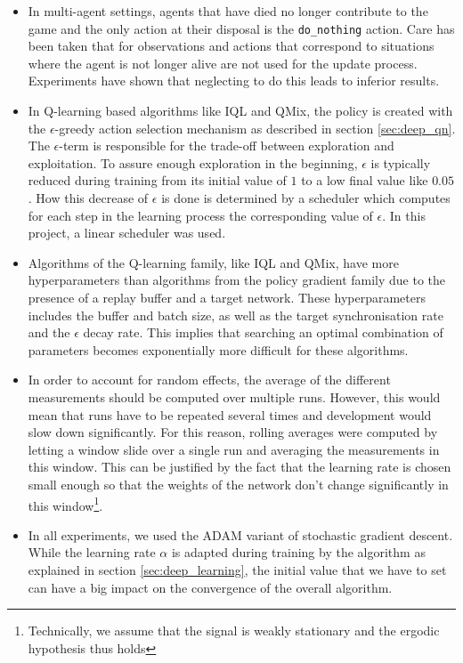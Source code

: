 \begin{itemize}
\begin{equation}
        \end{equation}
    \item In multi-agent settings, agents that have died no longer contribute to the game and the only action at their disposal is the {\tt do\_nothing} action. Care has been taken that for observations and actions that correspond to situations where the agent is not longer alive are not used for the update process. Experiments have shown that neglecting to do this leads to inferior results.
    \item In Q-learning based algorithms like IQL and QMix, the policy is created with the $\epsilon$-greedy action selection mechanism as described in section \ref{sec:deep_qn}. The $\epsilon$-term is responsible for the trade-off between exploration and exploitation. To assure enough exploration in the beginning, $\epsilon$ is typically reduced during training from its initial value of $1$ to a low final value like $0.05$. How this decrease of $\epsilon$ is done is determined by a scheduler which computes for each step in the learning process the corresponding value of $\epsilon$. In this project, a linear scheduler was used.
    \item Algorithms of the Q-learning family, like IQL and QMix, have more hyperparameters than algorithms from the policy gradient family due to the presence of a replay buffer and a target network. These hyperparameters includes the buffer and batch size, as well as the target synchronisation rate and the $\epsilon$ decay rate. This implies that searching an optimal combination of parameters becomes exponentially more difficult for these algorithms.
    \item In order to account for random effects, the average of the different measurements should be computed over multiple runs. However, this would mean that runs have to be repeated several times and development would slow down significantly. For this reason, rolling averages were computed by letting a window slide over a single run and averaging the measurements in this window. This can be justified by the fact that the learning rate is chosen small enough so that the weights of the network don't change significantly in this window\footnote{Technically, we assume that the signal is weakly stationary and the ergodic hypothesis thus holds}.
    \item In all experiments, we used the ADAM variant of stochastic gradient descent. While the learning rate $\alpha$ is adapted during training by the algorithm as explained in section \ref{sec:deep_learning}, the initial value that we have to set can have a big impact on the convergence of the overall algorithm.
\end{itemize}

